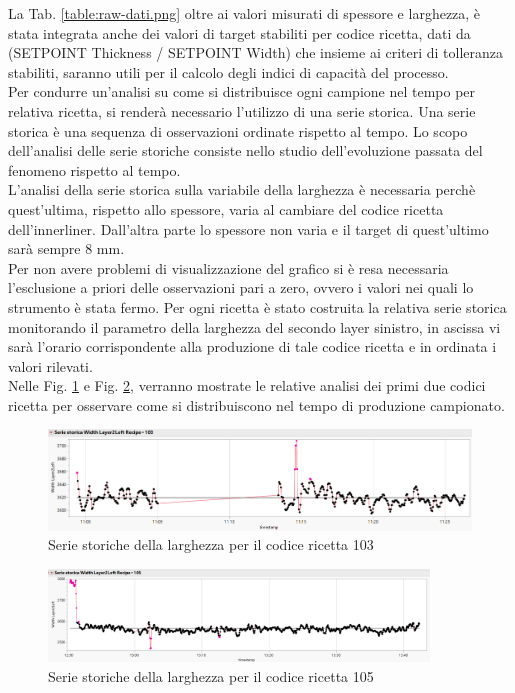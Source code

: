 La Tab. \ref{table:raw-dati.png} oltre ai valori misurati di spessore e larghezza, è stata integrata anche dei valori di target stabiliti per codice ricetta, dati da (SETPOINT Thickness / SETPOINT Width) che insieme ai criteri di tolleranza stabiliti, saranno utili per il calcolo degli indici di capacità del processo. \\
Per condurre un'analisi su come si distribuisce ogni campione nel tempo per relativa ricetta, si renderà necessario l'utilizzo di una serie storica. 
Una serie storica è una sequenza di osservazioni ordinate rispetto al tempo. Lo scopo dell’analisi delle serie storiche consiste nello studio dell’evoluzione passata del fenomeno rispetto al tempo. 
\cite{SerieStoriche} \\
L'analisi della serie storica sulla variabile della larghezza è necessaria perchè quest'ultima, rispetto allo spessore, varia al cambiare del codice ricetta dell'innerliner.
Dall'altra parte lo spessore non varia e il target di quest'ultimo sarà sempre 8 mm.  \\
Per non avere problemi di visualizzazione del grafico si è resa necessaria l'esclusione a priori delle osservazioni pari a zero, ovvero i valori nei quali lo strumento è stata fermo.
Per ogni ricetta è stato costruita la relativa serie storica monitorando il parametro della larghezza del secondo layer sinistro, in ascissa vi sarà l'orario corrispondente alla produzione di tale codice ricetta e in ordinata i valori rilevati.   \\
Nelle Fig. \ref{fig:Rec103-Raw-Time.png} e Fig. \ref{fig:Rec105-Raw-Time.png}, verranno mostrate le relative analisi dei primi due codici ricetta per osservare come si distribuiscono nel tempo di produzione campionato.

\begin{figure}[h]
  \centering
  \includegraphics[width=1\textwidth]{img/Rec103-Raw-Time.png}
  \caption{Serie storiche della larghezza per il codice ricetta 103}
  \label{fig:Rec103-Raw-Time.png}
\end{figure}

\begin{figure}[h]
  \centering
  \includegraphics[width=0.90\textwidth]{img/Rec105-Raw-Time.png}
  \caption{Serie storiche della larghezza per il codice ricetta 105}
  \label{fig:Rec105-Raw-Time.png}
\end{figure}

